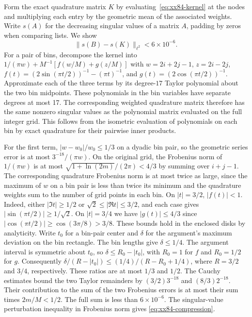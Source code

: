 Form the exact quadrature matrix $K$ by evaluating~\eqref{eq:xx84-kernel}
at the nodes and multiplying each entry by the geometric mean of the
associated weights. Write $s(A)$ for the decreasing singular values of
a matrix $A$, padding by zeros when comparing lists. We show
\begin{equation}\label{eq:xx84-compression}
 \|s(B)-s(K)\|_{\ell^2}<6\times10^{-6}.
\end{equation}
For a pair of bins, decompose the kernel into
$1/(\pi w)+M^{-1}[f(w/M)+g(z/M)]$ with $w=2i+2j-1$, $z=2i-2j$,
$f(t)=(2\sin(\pi t/2))^{-1}-(\pi t)^{-1}$, and
$g(t)=(2\cos(\pi t/2))^{-1}$. Approximate each of the three terms by
its degree-$17$ Taylor polynomial about the two bin midpoints. These
polynomials in the bin variables have separate degrees at most 17.
The corresponding weighted quadrature matrix therefore has the same
nonzero singular values as the polynomial matrix evaluated on the full
integer grid. This follows from the isometric evaluation of polynomials
on each bin by exact quadrature for their pairwise inner products.

For the first term, $|w-w_0|/w_0\le1/3$ on a dyadic bin pair, so the
geometric series error is at most $3^{-18}/(\pi w)$. On the original
grid, the Frobenius norm of $1/(\pi w)$ is at most
$\sqrt{1+\ln(2m)}/(2\pi)<4/3$ by summing over $i+j-1$. The corresponding
quadrature Frobenius norm is at most twice as large, since the maximum
of $w$ on a bin pair is less than twice its minimum and the quadrature
weights sum to the number of grid points in each bin.
On $|t|=3/2$, $|f(t)|<1$. Indeed, either $|\Im t|\ge1/2$ or
$\sqrt2\le |\Re t|\le 3/2$, and each case gives
$|\sin(\pi t/2)|\ge1/\sqrt2$. On $|t|=3/4$ we have $|g(t)|\le4/3$
since $|\cos(\pi t/2)|\ge\cos(3\pi/8)>3/8$. These bounds hold
in the enclosed disks by analyticity. Write $t_0$ for a bin-pair center
and $\delta$ for the argument's maximum deviation on the bin rectangle.
The bin lengths give $\delta\le1/4$. The argument interval is symmetric
about $t_0$, so $\delta\le R_0-|t_0|$, with $R_0=1$ for $f$ and
$R_0=1/2$ for $g$. Consequently
$\delta/(R-|t_0|)\le(1/4)/(R-R_0+1/4)$, where $R=3/2$ and $3/4$,
respectively. These ratios are at most $1/3$ and $1/2$.
The Cauchy estimates bound the two Taylor
remainders by $(3/2)3^{-18}$ and $(8/3)2^{-18}$. Their contribution to
the sum of the two Frobenius errors is at most their sum times
$2m/M<1/2$. The full sum is less than $6\times10^{-6}$. The
singular-value perturbation inequality in Frobenius norm gives
\eqref{eq:xx84-compression}.

